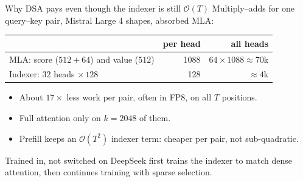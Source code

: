 \documentclass[handout]{beamer}
\begin{document}
\begin{frame}{Why DSA pays even though the indexer is still $\mathcal{O}(T)$}
  \small
  Multiply--adds for one query--key pair, Mistral Large 4 shapes, absorbed MLA:
  \par\vspace{6pt}
  \centering
  \begin{tabular}{@{}lrr@{}}
    \toprule
    & per head & all heads \\
    \midrule
    MLA: score ($512+64$) and value ($512$) & 1088 & $64\times1088\approx70$k \\
    Indexer: $32$ heads $\times\,128$ & 128 & $\approx4$k \\
    \bottomrule
  \end{tabular}
  \par\vspace{8pt}
  \raggedright
  \begin{itemize}
      \setlength{\itemsep}{4pt}
    \item About $17\times$ less work per pair, often in FP8, on all $T$ positions.
    \item Full attention only on $k=2048$ of them.
    \item Prefill keeps an $\mathcal{O}(T^2)$ indexer term: cheaper per pair, not sub-quadratic.
  \end{itemize}
  \begin{alertblock}{Trained in, not switched on}
    \small DeepSeek first trains the indexer to match dense attention, then continues training with sparse selection.
  \end{alertblock}
\end{frame}
\end{document}
